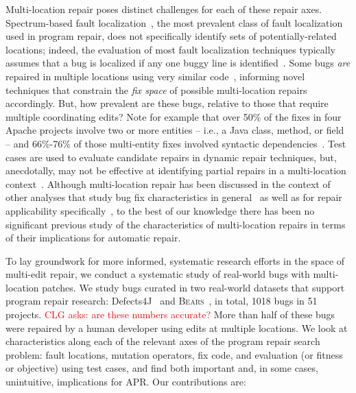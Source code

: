 \documentclass[10pt, conference]{IEEEtran}
\newcommand\todo[1]{\textcolor{red}{#1}}
\newcommand\bears{\textsc{Bears}\xspace}
\begin{document}
Multi-location repair poses distinct challenges for each of these repair axes.
Spectrum-based fault localization~\cite{ochiai}, the most prevalent class of
fault localization used in program repair, does not specifically
identify sets of potentially-related locations; indeed,
the evaluation of most fault localization techniques typically assumes that a bug
is localized if any one buggy line is identified~\cite{fl-survey-wong}.
Some bugs \emph{are}
repaired in multiple locations using very similar
code~\cite{saha2019harnessing,jiang2019cmsuggester}, informing novel techniques
that constrain the \emph{fix space} of possible multi-location repairs accordingly.
But, how prevalent are these bugs, 
relative to those that require multiple
coordinating edits?
Note for example that over 50\% of the fixes in four 
Apache projects involve two or more entities -- i.e., a Java class, method, or field -- and 66\%-76\% of 
those multi-entity fixes involved syntactic dependencies~\cite{wang2018}. 
Test cases are used to evaluate candidate repairs in dynamic
repair techniques, but, anecdotally, may not be effective
at identifying partial repairs in a multi-location
context~\cite{better-fitness}.  
Although multi-location repair has been discussed in the context of other analyses
that study bug fix characteristics in general~\cite{d4j-dissection} as well as for
repair applicability specifically~\cite{zhong2015, wang2018}, 
to the best of our
knowledge there has been no significant previous study of the characteristics of
multi-location repairs in terms of their implications for automatic
repair.

To lay groundwork for more informed, systematic research
efforts in the space of multi-edit repair, we conduct a systematic study of real-world bugs with
multi-location patches.  We study bugs curated in two
real-world datasets that support program repair research: Defects4J~\cite{defects4j}
and \bears~\cite{bears}, in total, 1018 bugs in 51 projects.
\todo{CLG asks: are these numbers accurate?}
More than half of these bugs were repaired by a
human developer using edits at multiple locations.  We look at characteristics along each of the
relevant axes of the program repair search problem: fault locations, mutation
operators, fix code, and evaluation (or fitness or objective) using test cases,
and find both important and, in some cases, unintuitive, implications for
APR.  Our contributions are:
\end{document}
